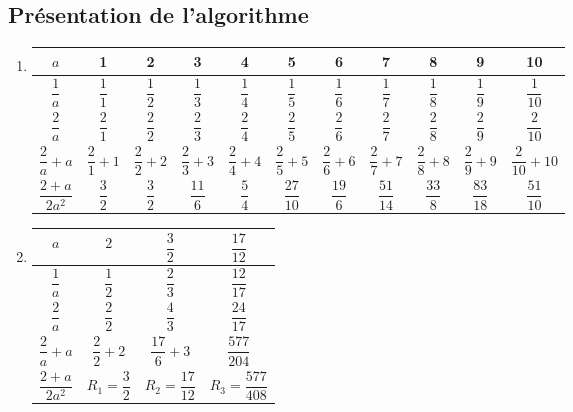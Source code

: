 \documentclass[french]{article}
\begin{document}
\subsection*{Présentation de l'algorithme}
\begin{enumerate}
\item 
\begin{center}
\begin{tabular}{|*{11}{c|}}
    \hline
    $a$ & 1  & 2  & 3  & 4  & 5  & 6  & 7  & 8  & 9  & 10 \\
    \hline
    $\dfrac{1}{a}$ & $\dfrac{1}{1}$  & $\dfrac{1}{2}$  & $\dfrac{1}{3}  $& $\dfrac{1}{4}  $& $\dfrac{1}{5} $& $\dfrac{1}{6}  $& $\dfrac{1}{7}  $& $\dfrac{1}{8}  $& $\dfrac{1}{9}  $&$ \dfrac{1}{10} $\\
    \hline

 $\dfrac{2}{a}$ & $\dfrac{2}{1}$  & $\dfrac{2}{2}$  & $\dfrac{2}{3}  $& $\dfrac{2}{4}  $& $\dfrac{2}{5} $& $\dfrac{2}{6}  $& $\dfrac{2}{7}  $& $\dfrac{2}{8}  $& $\dfrac{2}{9}  $&$ \dfrac{2}{10} $\\

    \hline
   $\dfrac{2}{a}+a$ & $\dfrac{2}{1}+1$  & $\dfrac{2}{2}+2$  & $\dfrac{2}{3} +3 $& $\dfrac{2}{4} +4 $& $\dfrac{2}{5} +5$& $\dfrac{2}{6} +6 $& $\dfrac{2}{7} +7 $& $\dfrac{2}{8} +8 $& $\dfrac{2}{9} +9  $&$ \dfrac{2}{10} +10 $\\
    \hline
    $\dfrac{2+a}{2a^2}$ & $\dfrac{3}{2}$  & $\dfrac{3}{2}$  & $\dfrac{11}{6} $& $\dfrac{5}{4} $& $\dfrac{27}{10}$& $\dfrac{19}{6} $& $\dfrac{51}{14}$& $\dfrac{33}{8} $& $\dfrac{83}{18} $&$ \dfrac{51}{10} $\\
    \hline
\end{tabular}
\end{center}
\item
\begin{center}
\begin{tabular}{|*{4}{c|}}
    \hline
    $a$ & $2$  & $\dfrac{3}{2}$  & $\dfrac{17}{12}$ \\
    \hline
    $\dfrac{1}{a}$  & $\dfrac{1}{2}$  & $\dfrac{2}{3}  $& $\dfrac{12}{17}  $\\
    \hline
 $\dfrac{2}{a}$ & $\dfrac{2}{2}$  & $\dfrac{4}{3}  $& $\dfrac{24}{17}  $\\
    \hline
   $\dfrac{2}{a}+a$  & $\dfrac{2}{2}+2$  & $\dfrac{17}{6} +3 $& $\dfrac{577}{204}$\\
    \hline
    $\dfrac{2+a}{2a^2}$ &  $R_1=\dfrac{3}{2}$  & $R_2=\dfrac{17}{12} $& $R_3=\dfrac{577}{408} $\\
    \hline
\end{tabular}
\end{center}

\end{enumerate}
\end{document}
